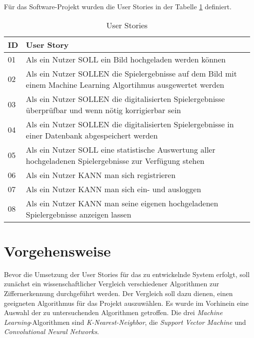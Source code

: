 Für das Software-Projekt wurden die User Stories in der Tabelle \ref{table:user_stories} definiert.
\begin{table}[]
    \begin{tabular}{m{2.5cm}|m{12cm}}
    \textbf{ID} & \textbf{User Story}                                                                                              \\ \hline
    01          & Als ein Nutzer SOLL ein Bild hochgeladen werden können                                                           \\
    02          & Als ein Nutzer SOLLEN die Spielergebnisse auf dem Bild mit einem Machine Learning Algortihmus ausgewertet werden \\
    03          & Als ein Nutzer SOLLEN die digitalisierten Spielergebnisse überprüfbar und wenn nötig korrigierbar sein           \\
    04          & Als ein Nutzer SOLLEN die digitalisierten Spielergebnisse in einer Datenbank abgespeichert werden                \\
    05          & Als ein Nutzer SOLL eine statistische Auswertung aller hochgeladenen Spielergebnisse zur Verfügung stehen        \\
    06          & Als ein Nutzer KANN man sich registrieren                                                                        \\
    07          & Als ein Nutzer KANN man sich ein- und ausloggen                                                                  \\
    08          & Als ein Nutzer KANN man seine eigenen hochgeladenen Spielergebnisse anzeigen lassen                             
    \end{tabular}
    \caption{User Stories}
    \label{table:user_stories}
\end{table}

\section{Vorgehensweise}
Bevor die Umsetzung der User Stories für das zu entwickelnde System erfolgt, soll zunächst ein wissenschaftlicher Vergleich verschiedener Algorithmen zur Ziffernerkennung durchgeführt werden. Der Vergleich soll dazu dienen, einen geeigneten Algorithmus für das Projekt auszuwählen. Es wurde im Vorhinein eine Auswahl der zu untersuchenden Algorithmen getroffen. Die drei \textit{Machine Learning}-Algorithmen sind \textit{K-Nearest-Neighbor}, die \textit{Support Vector Machine} und \textit{Convolutional Neural Networks}.


